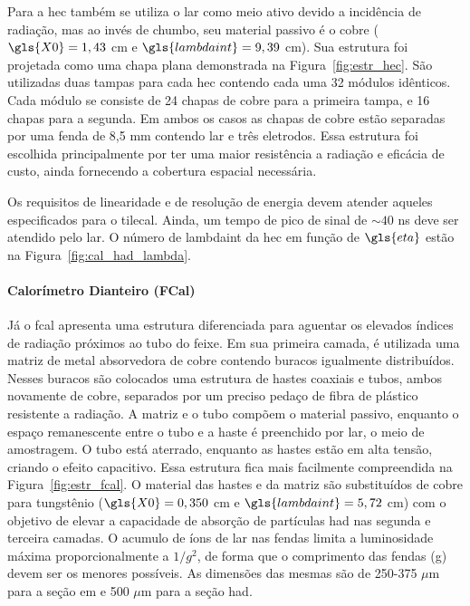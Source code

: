 Para a \gls{hec} também se utiliza o \gls{lar} como meio ativo devido a
incidência de radiação, mas ao invés de chumbo, seu material passivo é o cobre
($\gls{X0} = 1,43$ cm e $\gls{lambdaint}=9,39$ cm). 
Sua estrutura foi projetada como uma chapa plana 
demonstrada na Figura~\ref{fig:estr_hec}. São utilizadas duas tampas para cada
\gls{hec} contendo cada uma 32 módulos idênticos. Cada módulo se consiste de 24
chapas de cobre para a primeira tampa, e 16 chapas para a segunda. Em ambos os
casos as chapas de cobre estão separadas por uma fenda de 8,5 mm contendo
\gls{lar} e três eletrodos. Essa estrutura foi escolhida principalmente por ter
uma maior resistência a radiação e eficácia de custo, ainda fornecendo a
cobertura espacial necessária.

Os requisitos de linearidade e de resolução de energia devem atender aqueles
especificados para o \gls{tilecal}. Ainda, um tempo de pico de sinal
de $\sim40$ ns deve ser atendido pelo \gls{lar}. O número de \gls{lambdaint} da
\gls{hec} em função de $\gls{eta}$ estão na Figura~\ref{fig:cal_had_lambda}.

\paragraph{Calorímetro Dianteiro (FCal)}
\label{par:cal_fcal}

Já o \gls{fcal} apresenta uma estrutura diferenciada
para aguentar os elevados índices de radiação próximos ao tubo do feixe. Em sua primeira camada, 
é utilizada uma matriz de metal absorvedora de cobre contendo buracos igualmente
distribuídos. Nesses buracos são colocados uma estrutura de hastes coaxiais e tubos, 
ambos novamente de cobre, separados por um preciso pedaço de fibra de plástico resistente
a radiação. A matriz e o tubo compõem o material passivo,
enquanto o espaço remanescente entre o tubo e a haste é preenchido por \gls{lar},
o meio de amostragem. O tubo está aterrado, enquanto as hastes estão em alta tensão, 
criando o efeito capacitivo.
Essa estrutura fica mais facilmente compreendida na Figura~\ref{fig:estr_fcal}. 
O material das hastes e da matriz são substituídos de cobre para tungstênio
($\gls{X0} = 0,350$ cm e $\gls{lambdaint} = 5,72$ cm) com 
o objetivo de elevar a capacidade de absorção de partículas \gls{had} nas segunda 
e terceira camadas. O acumulo de íons de \gls{lar} nas fendas limita a
luminosidade máxima proporcionalmente a $1/g^2$, de forma que o comprimento das
fendas (g) devem ser os menores possíveis. 
As dimensões das mesmas são de 250-375 $\mu$m para a seção \gls{em} 
e 500 $\mu$m para a seção \gls{had}.

